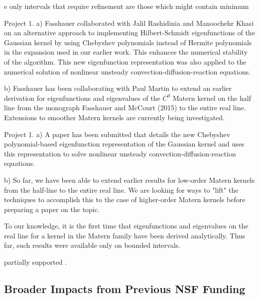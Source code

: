 \documentclass[11pt]{NSFamsart}
\begin{document}
e only 
intervals that require refinement are those which might contain minimum

Project 1. 
a) Fasshauer collaborated with Jalil Rashidinia and Manoochehr Khasi on an alternative 
approach to implementing Hilbert-Schmidt eigenfunctions of the Gaussian kernel by using 
Chebyshev polynomials instead of Hermite polynomials in the expansion used in our earlier 
work. This enhances the numerical stability of the algorithm. This new eigenfunction 
representation was also applied to the numerical solution of nonlinear unsteady 
convection-diffusion-reaction equations.

b) Fasshauer has been collaborating with Paul Martin to extend an earlier derivation for 
eigenfunctions and eigenvalues of the $C^0$ Matern kernel on the half line from the 
monograph Fasshauer and McCourt (2015) to the entire real line. Extensions to smoother 
Matern kernels are currently being investigated. 

Project 1. 
a) A paper has been submitted that details the new Chebyshev polynomial-based 
eigenfunction representation of the Gaussian kernel and uses this representation to solve 
nonlinear unsteady convection-diffusion-reaction equations.

b) So far, we have been able to extend earlier results for low-order Matern kernels from the 
half-line to the entire real line. We are looking for ways to "lift" the techniques to accomplish 
this to the case of higher-order Matern kernels before preparing a paper on the topic.


To our knowledge, it is the first time that eigenfunctions and eigenvalues on the real line for 
a kernel in the Matern family have been derived analytically. Thus far, such results were 
available only on bounded intervals.   





partially supported 
\cite{ChoEtal17a,GilEtal16a,HicEtal17a,HicJim16a,JimHic16a,ZhoHic15a,ChoEtal17b,HicEtal18a}.



\subsection{Broader Impacts from Previous NSF Funding}
\end{document}
